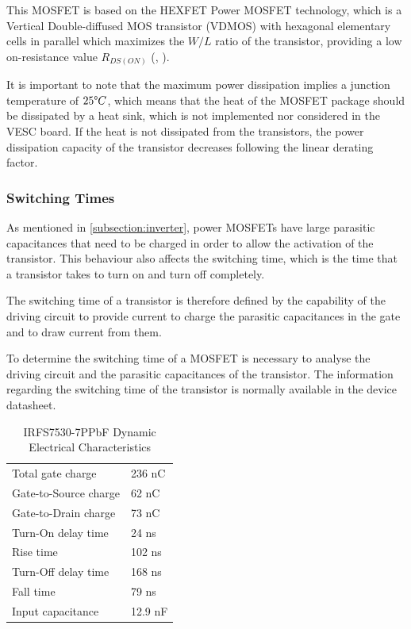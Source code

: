 This \ac{MOSFET} is based on the HEXFET Power \ac{MOSFET} technology, which is a Vertical Double-diffused MOS transistor (VDMOS) with hexagonal elementary cells in parallel which maximizes the $W/L$ ratio of the transistor, providing a low on-resistance value $R_{DS(ON)}$ (\citeauthor{GhioniPowerElec}, \citeyear{GhioniPowerElec}).


It is important to note that the maximum power dissipation implies a junction temperature of $25\degree C$, which means that the heat of the \ac{MOSFET} package should be dissipated by a heat sink, which is not implemented nor considered in the VESC board. If the heat is not dissipated from the transistors, the power dissipation capacity of the transistor decreases following the linear derating factor.

\subsubsection{Switching Times}\label{switching_times}

As mentioned in \ref{subsection:inverter}, power \ac{MOSFET}s have large parasitic capacitances that need to be charged in order to allow the activation of the transistor. This behaviour also affects the switching time, which is the time that a transistor takes to turn on and turn off completely.

The switching time of a transistor is therefore defined by the capability of the driving circuit to provide current to charge the parasitic capacitances in the gate and to draw current from them.

To determine the switching time of a \ac{MOSFET} is necessary to analyse the driving circuit and the parasitic capacitances of the transistor. The information regarding the switching time of the transistor is normally available in the device datasheet.

\begin{table}[]
\centering
\caption{IRFS7530-7PPbF Dynamic Electrical Characteristics}
\label{table:switchtime}
\begin{tabular}{@{}ll@{}}
\toprule
Total gate charge 		& 236 nC \\
Gate-to-Source charge 	& 62 nC \\
Gate-to-Drain charge 	& 73 nC \\
Turn-On delay time   	& 24 ns \\
Rise time       		& 102 ns \\
Turn-Off delay time     & 168 ns \\ 
Fall time               & 79 ns \\
Input capacitance  		& 12.9 nF \\
\bottomrule
\end{tabular}
\end{table}

